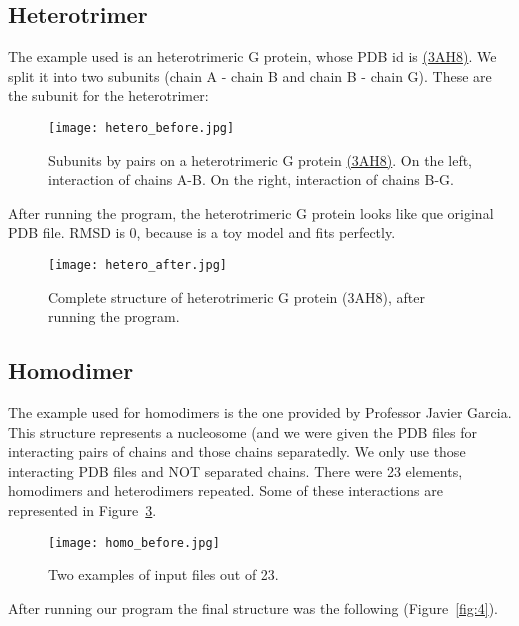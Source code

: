 \documentclass[a4paper,10pt]{report}
\begin{document}
\subsection{Heterotrimer}

The example used is an heterotrimeric G protein, whose PDB id is \href{https://www.rcsb.org/structure/3ah8}{(3AH8)}. We split it into two subunits (chain A - chain B and chain B - chain G). These are the subunit for the heterotrimer:

\begin{figure}[h]
\centering
\texttt{[image: hetero\_before.jpg]}
\caption{Subunits by pairs on a heterotrimeric G protein \href{https://www.rcsb.org/structure/3ah8}{(3AH8)}. On the left, interaction of chains A-B. On the right, interaction of chains B-G.}
\label{fig:1}
\end{figure}

\noindent
After running the program, the heterotrimeric G protein looks like que original PDB file. RMSD is 0, because is a toy model and fits perfectly.

\begin{figure}[h]
\centering
\texttt{[image: hetero\_after.jpg]}
\caption{Complete structure of heterotrimeric G protein (3AH8), after running the program.}
\label{fig:2}
\end{figure}

\newpage

\subsection{Homodimer}

The example used for homodimers is the one provided by Professor Javier Garcia. This structure represents a nucleosome (and we were given the PDB files for interacting pairs of chains and those chains separatedly. We only use those interacting PDB files and NOT separated chains. There were 23 elements, homodimers and heterodimers repeated. Some of these interactions are represented in Figure~\ref{fig:3}.\\

\begin{figure}[h]
\texttt{[image: homo\_before.jpg]}
\centering
\caption{Two examples of input files out of 23.}
\label{fig:3}
\end{figure}

\noindent
After running our program the final structure was the following (Figure~\ref{fig:4}).\\
\end{document}
